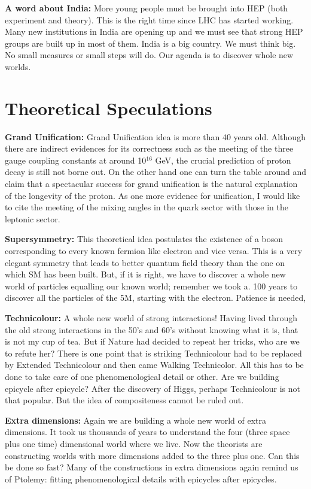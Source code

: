 \textbf{A word about India:} More young people must be brought into HEP
(both experiment and theory). This is the right time since LHC has started
working. Many new institutions in India are opening up and we must see
that strong HEP groups are built up in most of them. India is a big country.
We must think big. No small measures or small steps will do. Our agenda is
to discover whole new worlds. 


\section*{Theoretical Speculations} 


\textbf{Grand Unification:} Grand Unification idea is more than 40 years old.
Although there are indirect evidences for its correctness such as the meeting
of the three gauge coupling constants at around 10$^16$ GeV, the crucial prediction of proton decay is still not borne out. On the other hand one can turn
the table around and claim that a spectacular success for grand unification is
the natural explanation of the longevity of the proton. As one more evidence
for unification, I would like to cite the meeting of the mixing angles in the
quark sector with those in the leptonic sector. 

\textbf{Supersymmetry:} This theoretical idea postulates the existence of a boson corresponding to every known fermion like electron and vice versa. This
is a very elegant symmetry that leads to better quantum field theory than
the one on which SM has been built. But, if it is right, we have to discover a
whole new world of particles equalling our known world; remember we took
a. 100 years to discover all the particles of the 5M, starting with the electron.
Patience is needed,  

\textbf{Technicolour:} A whole new world of strong interactions! Having lived
through the old strong interactions in the 50's and 60's without knowing
what it is, that is not my cup of tea. But if Nature had decided to repeat
her tricks, who are we to refute her? There is one point that is striking Technicolour had to be replaced by Extended Technicolour and then came
Walking Technicolor. All this has to be done to take care of one phenomenological detail or other. Are we building epicycle after epicycle? After the
discovery of Higgs, perhaps Technicolour is not that popular. But the idea
of compositeness cannot be ruled out. 

\textbf{Extra dimensions:} Again we are building a whole new world of extra
dimensions. It took us thousands of years to understand the four (three space
plus one time) dimensional world where we live. Now the theorists are constructing worlds with more dimensions added to the three plus one. Can this
be done so fast? Many of the constructions in extra dimensions again remind
us of Ptolemy: fitting phenomenological details with epicycles after epicycles. 


